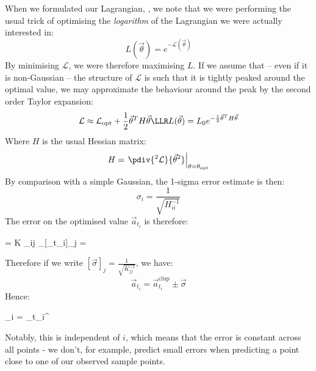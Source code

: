 \documentclass[]{article}
\def\ai{\vec{a}_{t_i}}
\begin{document}
			When we formulated our Lagrangian, , we note that we were performing the usual trick of optimising the \textit{logarithm} of the Lagrangian we were actually interested in:
			\begin{equation}
				L(\vec{\theta}) = e^{-\mathcal{L}(\vec{\theta})}
			\end{equation}
			By minimising $\mathcal{L}$, we were therefore maximising $L$. If we assume that -- even if it is non-Gaussian -- the structure of $\mathcal{L}$ is such that it is tightly peaked around the optimal value, we may approximate the behaviour around the peak by the second order Taylor expansion:
			\begin{equation}
				\mathcal{L} \approx \mathcal{L}_\text{opt} + \frac{1}{2}\vec{\theta}^T H \vec{\theta} \LLR L(\vec{\theta}) = L_0 e^{-\frac{1}{2}\vec{\theta}^T H \vec{\theta}}
			\end{equation}
			Where $H$ is the usual Hessian matrix:
			\begin{equation}
				H = \left. \pdiv{^2 \mathcal{L}}{\vec{\theta}^2} \right|_{\theta = \theta_\text{opt}}
			\end{equation}
			By comparison with a simple Gaussian, the 1-sigma error estimate is then:
			\begin{equation}
				\sigma_i = \frac{1}{\sqrt{H^{-1}_{ii}}}
			\end{equation}
			The error on the optimised value $\ai$ is therefore:
			\begin{spalign}
				\pdiv{^2\mathcal{L}}{\ai \partial {}_j} = K \delta_{ij} \LLR \sigma_{[\ai]_j} = 
			\end{spalign}
			Therefore if we write $[\vec{\sigma}]_j = \frac{1}{\sqrt{K^{-1}_{jj}}}$, we have:
			\begin{equation}
				\ai = \ai^{\text{clup}} \pm \vec{\sigma}
			\end{equation}
			Hence:
			\begin{spalign}
				_i = \ai^{}\cdot {} \pm \vec{\sigma} \cdot \vec{X}
			\end{spalign}
			Notably, this is independent of $i$, which means that the error is constant across all points - we don't, for example, predict small errors when predicting a point close to one of our  observed sample points.

\end{document}
